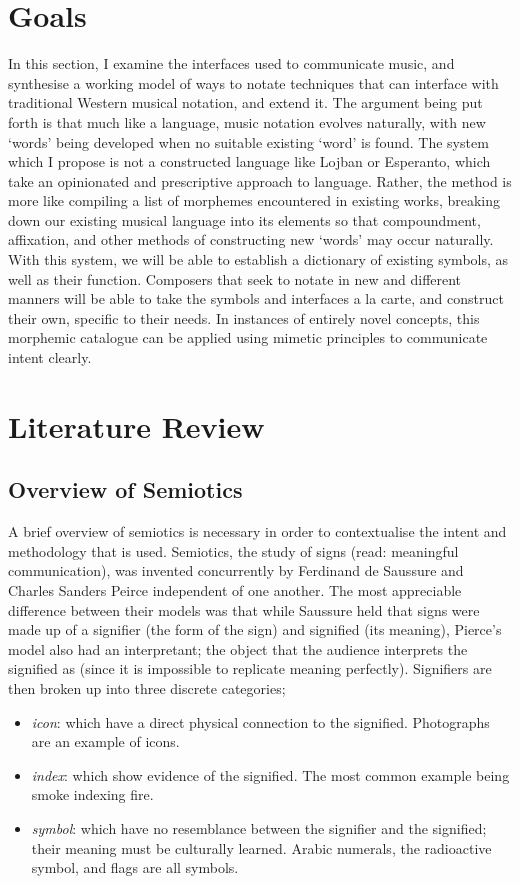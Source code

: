 \section{Goals}

In this section, I examine the interfaces used to communicate music, and synthesise a working model of ways to notate techniques that can interface with traditional Western musical notation, and extend it.
The argument being put forth is that much like a language, music notation evolves naturally, with new `words' being developed when no suitable existing `word' is found.
The system which I propose is not a constructed language like Lojban or Esperanto, which take an opinionated and prescriptive approach to language. 
Rather, the method is more like compiling a list of morphemes encountered in existing works, breaking down our existing musical language into its elements so that compoundment, affixation, and other methods of constructing new `words' may occur naturally.
With this system, we will be able to establish a dictionary of existing symbols, as well as their function.
Composers that seek to notate in new and different manners will be able to take the symbols and interfaces a la carte, and construct their own, specific to their needs.
In instances of entirely novel concepts, this morphemic catalogue can be applied using mimetic principles to communicate intent clearly.

\section{Literature Review}

\subsection{Overview of Semiotics}

A brief overview of semiotics is necessary in order to contextualise the intent and methodology that is used.
Semiotics, the study of signs (read: meaningful communication), was invented concurrently by Ferdinand de Saussure and Charles Sanders Peirce independent of one another.\autocite[]{saussure}
The most appreciable difference between their models was that while Saussure held that signs were made up of a signifier (the form of the sign) and signified (its meaning), Pierce's model also had an interpretant; the object that the audience interprets the signified as (since it is impossible to replicate meaning perfectly).\autocite[]{pierce}
Signifiers are then broken up into three discrete categories; 
\begin{itemize}
\item \emph{\gls{icon}}: which have a direct physical connection to the signified. Photographs are an example of icons.
\item \emph{\gls{index}}: which show evidence of the signified. The most common example being smoke indexing fire.
\item \emph{\gls{symbol}}: which have no resemblance between the signifier and the signified; their meaning must be culturally learned. Arabic numerals, the radioactive symbol, and flags are all symbols.
\end{itemize}

